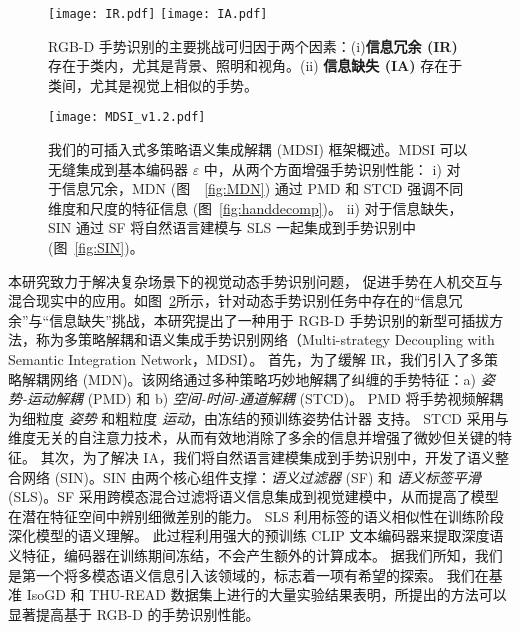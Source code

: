 \begin{figure}[tb]
\centering
{}
{\texttt{[image: IR.pdf]}}
{\texttt{[image: IA.pdf]}}
\caption{RGB-D 手势识别的主要挑战可归因于两个因素：(i)\textbf{信息冗余 (IR)} 存在于类内，尤其是背景、照明和视角。(ii) \textbf{信息缺失 (IA)} 存在于类间，尤其是视觉上相似的手势。}
\label{fig:samples}
\end{figure}


\begin{figure}[tb]
\centering
\texttt{[image: MDSI\_v1.2.pdf]}%
\caption{我们的可插入式多策略语义集成解耦 (MDSI) 框架概述。MDSI 可以无缝集成到基本编码器 $\varepsilon$ 中，从两个方面增强手势识别性能：
i) 对于信息冗余，MDN (图~~\ref{fig:MDN}) 通过 PMD 和 STCD 强调不同维度和尺度的特征信息 (图~\ref{fig:handdecomp})。
ii) 对于信息缺失，SIN 通过 SF 将自然语言建模与 SLS 一起集成到手势识别中 (图~\ref{fig:SIN})。}
\label{fig:MDSI}
\end{figure}

本研究致力于解决复杂场景下的视觉动态手势识别问题，
促进手势在人机交互与混合现实中的应用。如图~\ref{fig:MDSI}所示，针对动态手势识别任务中存在的“信息冗余”与“信息缺失”挑战，本研究提出了一种用于 RGB-D 手势识别的新型可插拔方法，称为多策略解耦和语义集成手势识别网络（Multi-strategy Decoupling with Semantic Integration Network，MDSI）。
首先，为了缓解 IR，我们引入了多策略解耦网络 (MDN)。该网络通过多种策略巧妙地解耦了纠缠的手势特征：a) \emph{姿势-运动解耦} (PMD) 和 b) \emph{空间-时间-通道解耦} (STCD)。
PMD 将手势视频解耦为细粒度 \emph{姿势} 和粗粒度 \emph{运动}，由冻结的预训练姿势估计器 \cite{sun2019deep} 支持。
STCD 采用与维度无关的自注意力技术，从而有效地消除了多余的信息并增强了微妙但关键的特征。
其次，为了解决 IA，我们将自然语言建模集成到手势识别中，开发了语义整合网络 (SIN)。SIN 由两个核心组件支撑：\emph{语义过滤器} (SF) 和 \emph{语义标签平滑} (SLS)。SF 采用跨模态混合过滤将语义信息集成到视觉建模中，从而提高了模型在潜在特征空间中辨别细微差别的能力。
SLS 利用标签的语义相似性在训练阶段深化模型的语义理解。
此过程利用强大的预训练 CLIP 文本编码器来提取深度语义特征，编码器在训练期间冻结，不会产生额外的计算成本。
据我们所知，我们是第一个将多模态语义信息引入该领域的，标志着一项有希望的探索。
我们在基准 IsoGD 和 THU-READ 数据集上进行的大量实验结果表明，所提出的方法可以显著提高基于 RGB-D 的手势识别性能。

